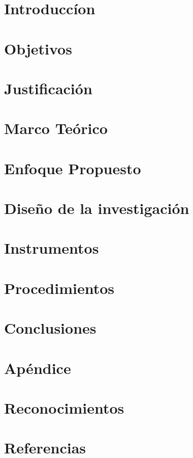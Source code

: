\documentclass[conference]{IEEEtran}
\begin{document}


\maketitle





\section{Introduccíon}


\section{Objetivos}


\section{Justificación}


\section{Marco Teórico}


\section{Enfoque Propuesto}


\section{Diseño de la investigación}


\section{Instrumentos}


\section{Procedimientos}


\section{Conclusiones}


\appendix
\section{Apéndice}


\section{Reconocimientos}


\section{Referencias}



\end{document}
